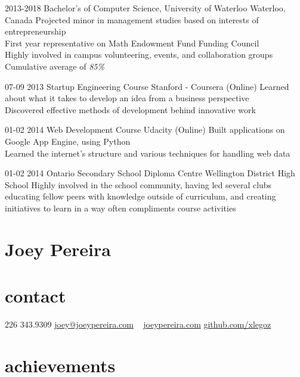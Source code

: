 \documentclass[]{friggeri-cv-short}
\newcommand{\imp}[1] {{\em #1}}
\begin{document}
\begin{entrylist}
  \entry
    {2013-2018}
    {Bachelor's of Computer Science, University of Waterloo}
    {Waterloo, Canada}
	{Projected minor in management studies based on interests of entrepreneurship \\
	First year representative on Math Endowment Fund Funding Council \\
	Highly involved in campus volunteering, events, and collaboration groups \\ Cumulative average of \imp{85\%}}
	
  \entry
  	{07-09 2013}
  	{Startup Engineering Course}
  	{Stanford - Coursera (Online)}
  	{Learned about what it takes to develop an idea from a business perspective \\
  	Discovered effective methods of development behind innovative work}
  	
  \entry
  	{01-02 2014}
  	{Web Development Course}
  	{Udacity (Online)}
  	{Built applications on Google App Engine, using Python \\
  	Learned the internet's structure and various techniques for handling web data}
  	
  \entry
  	{01-02 2014}
  	{Ontario Secondary School Diploma}
  	{Centre Wellington District High School}
    {Highly involved in the school community, having led several clubs educating fellow peers with knowledge outside of curriculum, and creating initiatives to learn in a way often compliments course activities}
\end{entrylist}

\begin{asidetwo}  	
	\section{Joey Pereira}
	\section{contact}
    226 343.9309
    \href{mailto:joey@joeypereira.com}{joey@joeypereira.com}
    ~
    \href{http://joeypereira.com}{joeypereira.com}
    \href{http://www.github.com/xlegoz}{github.com/xlegoz}
\end{asidetwo}






\section{achievements}
\end{document}
